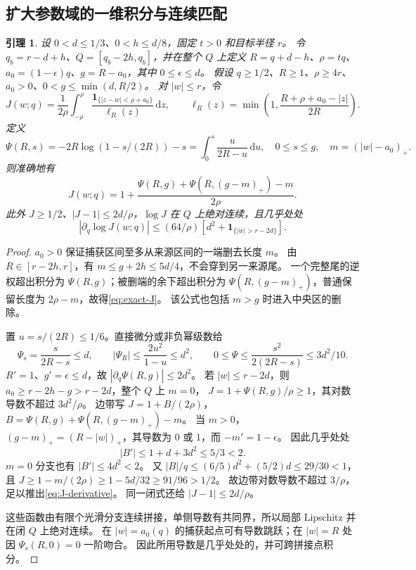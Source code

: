 \documentclass[UTF8,a4paper,11pt,fontset=fandol]{ctexart}
\newtheorem{lemma}{引理}[section]
\theoremstyle{remark}
\newcommand{\one}{\mathbf 1}
\newcommand{\dint}{\,\mathrm d}
\begin{document}
\subsection{扩大参数域的一维积分与连续匹配}\label{subsec:refined-local}
\begin{lemma}\label{lem:inverse-local}
设 $0<d\le1/3$、$0<h\le d/8$，固定 $t>0$ 和目标半径 $r$。
令 $q_b=r-d+h$、$Q=[q_b-2h,q_b]$，并在整个 $Q$ 上定义
$R=q+d-h$、$\rho=tq$、$a_0=(1-\epsilon)q$、$g=R-a_0$，其中 $0\le\epsilon\le d$。
假设 $q\ge1/2$、$R\ge1$、$\rho\ge4r$、$a_0>0$、$0<g\le\min(d,R/2)$。
对 $|w|\le r$，令
\begin{equation}\label{eq:inverse-J}
 J(w;q)=\frac1{2\rho}\int_{-\rho}^{\rho}
 \frac{\one_{\{|z-w|<\rho+a_0\}}}{\ell_R(z)}\dint z,
 \qquad\ell_R(z)=\min\left(1,\frac{R+\rho+a_0-|z|}{2R}\right).
\end{equation}
定义
\[
 \Psi(R,s)=-2R\log(1-s/(2R))-s
 =\int_0^s\frac{u}{2R-u}\dint u,\quad0\le s\le g,
 \quad m=(|w|-a_0)_+.
\]
则准确地有
\begin{equation}\label{eq:exact-J}
 J(w;q)=1+\frac{\Psi(R,g)+\Psi(R,(g-m)_+)-m}{2\rho}.
\end{equation}
此外 $J\ge1/2$、$|J-1|\le2d/\rho$，$\log J$ 在 $Q$ 上绝对连续，且几乎处处
\begin{equation}\label{eq:J-derivative}
 |\partial_q\log J(w;q)|\le(64/\rho)[d^2+\one_{\{|w|>r-2d\}}].
\end{equation}
\end{lemma}
\begin{proof}
$a_0>0$ 保证捕获区间至多从来源区间的一端删去长度 $m$。
由 $R\in[r-2h,r]$，有 $m\le g+2h\le5d/4$，不会穿到另一来源尾。
一个完整尾的逆权超出积分为 $\Psi(R,g)$；被删端的余下超出积分为
$\Psi(R,(g-m)_+)$，普通保留长度为 $2\rho-m$，故得\eqref{eq:exact-J}。
该公式也包括 $m>g$ 时进入中央区的删除。

置 $u=s/(2R)\le1/6$。直接微分或非负幂级数给
\[
 \Psi_s=\frac{s}{2R-s}\le d,\qquad
 |\Psi_R|\le\frac{2u^2}{1-u}\le d^2,\qquad
 0\le\Psi\le\frac{s^2}{2(2R-s)}\le3d^2/10.
\]
$R'=1$、$g'=\epsilon\le d$，故 $|\partial_q\Psi(R,g)|\le2d^2$。
若 $|w|\le r-2d$，则 $a_0\ge r-2h-g>r-2d$，整个 $Q$ 上 $m=0$，
$J=1+\Psi(R,g)/\rho\ge1$，其对数导数不超过 $3d^2/\rho$。
边带写 $J=1+B/(2\rho)$，$B=\Psi(R,g)+\Psi(R,(g-m)_+)-m$。
当 $m>0$，$(g-m)_+=(R-|w|)_+$，其导数为 $0$ 或 $1$，而 $-m'=1-\epsilon$。
因此几乎处处
\[
 |B'|\le1+d+3d^2\le5/3<2.
\]
$m=0$ 分支也有 $|B'|\le4d^2<2$。
又 $|B|/q\le(6/5)d^2+(5/2)d\le29/30<1$，且
$J\ge1-m/(2\rho)\ge1-5d/32\ge91/96>1/2$。
故边带对数导数不超过 $3/\rho$，足以推出\eqref{eq:J-derivative}。
同一闭式还给 $|J-1|\le2d/\rho$。

这些函数由有限个光滑分支连续拼接，单侧导数有共同界，所以局部 Lipschitz 并在闭 $Q$ 上绝对连续。
在 $|w|=a_0(q)$ 的捕获起点可有导数跳跃；在 $|w|=R$ 处因 $\Psi_s(R,0)=0$ 一阶吻合。
因此所用导数是几乎处处的，并可跨拼接点积分。
\end{proof}
\end{document}
